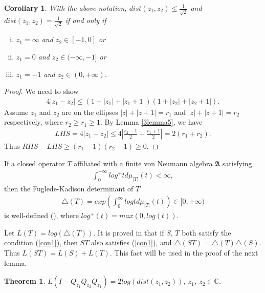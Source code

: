 \documentclass{amsart}
\newcommand{\AAA}{\mathfrak A}
\newcommand{\C}{\mathbb C} %
\newtheorem{theorem}{Theorem}[section]
\newtheorem{corollary}{Corollary}[section]
\begin{document}
\begin{corollary}\label{3con3}
With the above notation, $dist(z_1 , z_2) \leq \frac{1}{\sqrt{2}}$ and $dist(z_1, z_2) =\frac{1}{\sqrt{2}}$ if and only if
\begin{enumerate}[(i)]
 \item  $z_1 = \infty$ and $z_2 \in [-1, 0]$ or
 \item  $z_1 = 0$ and $z_2 \in (-\infty , -1]$ or
 \item  $z_1 = -1$ and $z_2 \in (0, +\infty)$.
\end{enumerate}
\end{corollary}

\begin{proof}
We need to show
\begin{align*}
4|z_1 - z_2| \leq (1 + |z_1| + |z_1 + 1|)(1 + |z_2| + |z_2 + 1|).
\end{align*}
Assume $z_1$ and $z_2$ are on the ellipses $|z|+|z+1| = r_1$ and
$|z|+|z+1| = r_2$ respectively, where $r_2 \geq r_1 \geq 1$. By Lemma \ref{3lemma5},
we have
\begin{align*}
LHS = 4|z_1 - z_2| \leq 4|\frac{r_2-1}{2} + \frac{r_1 + 1}{2}| = 2(r_1 + r_2).
\end{align*}
Thus $RHS - LHS \geq (r_1 - 1)(r_2 -1) \geq 0$.
\end{proof}

If a closed operator $T$ affiliated with a finite von Neumann algebra $\AAA$ satisfying
\begin{equation}\label{con1}
\begin{split}
\int_{0}^{+\infty} log^{+} t d\mu_{|T|}(t) < \infty,
\end{split}
\end{equation}
then the Fuglede-Kadison determinant of $T$ 
\begin{align*}
\triangle(T) = exp \left(\int_{0}^{\infty} log t d \mu_{|T|}(t) \right) \in [ 0, +\infty)
\end{align*}
is well-defined (\cite{FK}), where $log^{+} (t) = max( 0, log(t))$.

Let $L(T) = log(\triangle(T))$.
It is proved in \cite{HH} that if $S$, $T$ both satisfy the condition (\ref{con1}), then $ST$ also satisfies (\ref{con1}), and $\triangle(ST) = \triangle(T)\triangle(S)$.
Thus $L(ST) = L(S) + L(T)$. This fact will be used in the proof of the next lemma.

\begin{theorem}\label{3thm1}
$L(I - Q_{z_1}Q_{z_2}Q_{z_1}) = 2log(dist(z_1, z_2))$, $z_1$, $z_2 \in \C$.
\end{theorem} 
\end{document}
